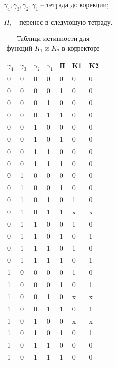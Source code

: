 \documentclass[a4paper,14pt]{article}
\begin{document}
$\gamma_4, \gamma_3, \gamma_2, \gamma_1$ -- тетрада до корекции;

$\Pi_i$ -- перенос в следующую тетраду.

\begin{table}[H]
	\begin{center}
		\caption{\label{tab:dvKorr} Таблица истинности для функций $K_1$ и $K_2$ в корректоре}
	\begin{tabular}{|l|l|l|l|l|l|l|}
		\hline
		$\gamma_4$ & $\gamma_3$ & $\gamma_2$ & $\gamma_1$ & П & K1 & K2 \\ \hline
		0  & 0  & 0  & 0  & 0 & 0  & 0  \\ \hline
		0  & 0  & 0  & 0  & 1 & 0  & 0  \\ \hline
		0  & 0  & 0  & 1  & 0 & 0  & 0  \\ \hline
		0  & 0  & 0  & 1  & 1 & 0  & 0  \\ \hline
		0  & 0  & 1  & 0  & 0 & 0  & 0  \\ \hline
		0  & 0  & 1  & 0  & 1 & 0  & 0  \\ \hline
		0  & 0  & 1  & 1  & 0 & 0  & 0  \\ \hline
		0  & 0  & 1  & 1  & 1 & 0  & 0  \\ \hline
		0  & 1  & 0  & 0  & 0 & 0  & 0  \\ \hline
		0  & 1  & 0  & 0  & 1 & 0  & 0  \\ \hline
		0  & 1  & 0  & 1  & 0 & 1  & 0  \\ \hline
		0  & 1  & 0  & 1  & 1 & x  & x  \\ \hline
		0  & 1  & 1  & 0  & 0 & 1  & 0  \\ \hline
		0  & 1  & 1  & 0  & 1 & 0  & 1  \\ \hline
		0  & 1  & 1  & 1  & 0 & 1  & 0  \\ \hline
		0  & 1  & 1  & 1  & 1 & 0  & 1  \\ \hline
		1  & 0  & 0  & 0  & 0 & 1  & 0  \\ \hline
		1  & 0  & 0  & 0  & 1 & 0  & 1  \\ \hline
		1  & 0  & 0  & 1  & 0 & x  & x  \\ \hline
		1  & 0  & 0  & 1  & 1 & 0  & 1  \\ \hline
		1  & 0  & 1  & 0  & 0 & x  & x  \\ \hline
		1  & 0  & 1  & 0  & 1 & 0  & 1  \\ \hline
		1  & 0  & 1  & 1  & 0 & 0  & 0  \\ \hline
		1  & 0  & 1  & 1  & 1 & 0  & 0  \\ \hline

\end{tabular}
\end{center}
\end{table}
\end{document}
